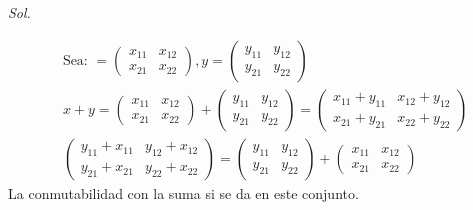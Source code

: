 \textit{ Sol. }

\begin{align*}
	 & \text{Sea: }=\begin{pmatrix}
		                x_{11} & x_{12} \\x_{21}&x_{22}
	                \end{pmatrix},y=\begin{pmatrix}y_{11} & y_{12} \\y_{21}&y_{22}
	                                \end{pmatrix}                 \\
	 & x+y=\begin{pmatrix}
		       x_{11} & x_{12} \\x_{21}&x_{22}
	       \end{pmatrix}+\begin{pmatrix}
		                     y_{11} & y_{12} \\y_{21}&y_{22}
	                     \end{pmatrix}=\begin{pmatrix}
		                                   x_{11}+y_{11} & x_{12}+y_{12} \\x_{21}+y_{21}&x_{22}+y_{22}
	                                   \end{pmatrix} \\
	 & \begin{pmatrix}
		   y_{11}+x_{11} & y_{12}+x_{12} \\y_{21}+x_{21}&y_{22}+x_{22}
	   \end{pmatrix}=\begin{pmatrix}
		                 y_{11} & y_{12} \\y_{21}&y_{22}
	                 \end{pmatrix}+\begin{pmatrix}
		                               x_{11} & x_{12} \\x_{21}&x_{22}
	                               \end{pmatrix}
\end{align*}
La conmutabilidad con la suma si se da en este conjunto.

